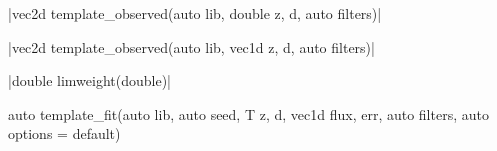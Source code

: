 \funcitem \cppinline|vec2d template_observed(auto lib, double z, d, auto filters)| 

\cppinline|vec2d template_observed(auto lib, vec1d z, d, auto filters)|

\funcitem \vectorfunc \cppinline|double limweight(double)| 

\funcitem {} \begin{cppcode}
auto template_fit(auto lib, auto seed, T z, d, vec1d flux, err,
                  auto filters, auto options = default)
\end{cppcode}
